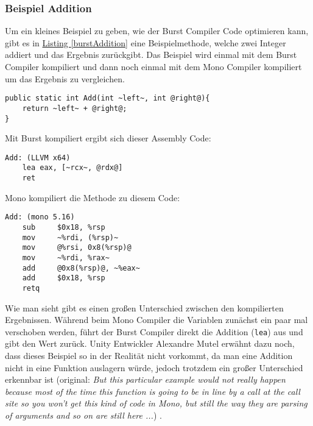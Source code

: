 \subsubsection[Beispiel Addition]{Beispiel Addition}
Um ein kleines Beispiel zu geben, wie der Burst Compiler Code optimieren kann, gibt es in \hyperref[burstAddition]{Listing \ref*{burstAddition}} eine Beispielmethode, welche zwei Integer addiert und das Ergebnis zurückgibt. Das Beispiel wird einmal mit dem Burst Compiler kompiliert und dann noch einmal mit dem Mono Compiler kompiliert um das Ergebnis zu vergleichen.
\begin{lstlisting}[style=code, caption={[Beispiel einer Addition]Beispiel einer Addition, ausgelagert in eine Methode.}, label = burstAddition]
public static int Add(int ~left~, int @right@){
	return ~left~ + @right@;
}
\end{lstlisting}
Mit Burst kompiliert ergibt sich dieser Assembly Code:
\begin{lstlisting}[style=code, caption={Addition Burst kompiliert}]
Add: (LLVM x64)
	lea eax, [~rcx~, @rdx@]
	ret
\end{lstlisting}
Mono kompiliert die Methode zu diesem Code:
\begin{lstlisting}[style=code, caption={Addition Mono kompiliert}]
Add: (mono 5.16)
	sub		$0x18, %rsp
	mov		~%rdi, (%rsp)~
	mov 	@%rsi, 0x8(%rsp)@
	mov 	~%rdi, %rax~
	add 	@0x8(%rsp)@, ~%eax~
	add 	$0x18, %rsp
	retq
\end{lstlisting}
Wie man sieht gibt es einen großen Unterschied zwischen den kompilierten Ergebnissen. Während beim Mono Compiler die Variablen zunächst ein paar mal verschoben werden, führt der Burst Compiler direkt die Addition (\texttt{lea}) aus und gibt den Wert zurück. Unity Entwickler Alexandre Mutel erwähnt dazu noch, dass dieses Beispiel so in der Realität nicht vorkommt, da man eine Addition nicht in eine Funktion auslagern würde, jedoch trotzdem ein großer Unterschied erkennbar ist (original: \textit{But this particular example would not really happen because most of the time this function is going to be in line by a call at the call site so you won't get this kind of code in Mono, but still the way they are parsing of arguments and so on are still here ...}) \cite{Burst-Unite_LA}.